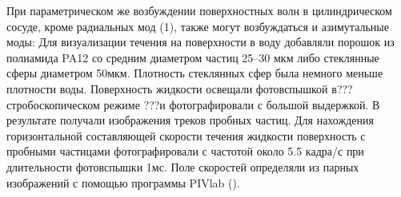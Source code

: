 %
%
%
%
%
%
%
При параметрическом же возбуждении поверхностных волн в цилиндрическом сосуде, кроме радиальных мод (1), также могут возбуждаться и азимутальные моды:
%
%
%
Для визуализации течения на поверхности в воду добавляли порошок из полиамида PA12 со средним диаметром частиц 25–30 мкм либо стеклянные сферы диаметром 50мкм. Плотность стеклянных сфер была немного меньше плотности воды. Поверхность жидкости освещали фотовспышкой в??? стробоскопическом режиме ???и фотографировали с большой выдержкой. В результате получали изображения треков пробных частиц. Для нахождения горизонтальной составляющей скорости течения жидкости поверхность с пробными частицами фотографировали с частотой около 5.5 кадра/с при длительности фотовспышки 1мс. Поле скоростей определяли из парных изображений с помощью программы PIVlab \cite{PIVlab}(). 

